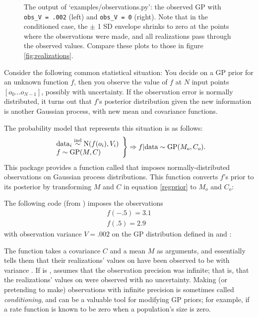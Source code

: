 \begin{figure}
    \centering
    \caption{The output of {\sffamily `examples/observations.py'}: the observed GP with \texttt{obs_V = .002} (left) and \texttt{obs_V = 0} (right). Note that in the conditioned case, the $\pm$ 1 SD envelope shrinks to zero at the points where the observations were made, and all realizations pass through the observed values. Compare these plots to those in figure \ref{fig:realizations}.}
    \label{fig:obs}
\end{figure}

Consider the following common statistical situation: You decide on a GP prior for an unknown function $f$, then you observe the value of $f$ at $N$ input points $[o_0\ldots o_{N-1}]$, possibly with uncertainty. If the observation error is normally distributed, it turns out that $f$'s posterior distribution given the new information is another Gaussian process, with new mean and covariance functions.

The probability model that represents this situation is as follows:
\begin{equation}
    \label{regprior}
    \left.\begin{array}{l}
        \textup{data}_i \stackrel{\tiny{\textup{ind}}}{\sim} \textup{N}(f(o_i), V_i)\\
        f \sim \textup{GP}(M,C)\\
    \end{array}\right\}\Rightarrow f|\textup{data} \sim \textup{GP}(M_o, C_o).
\end{equation}
This package provides a function called  that imposes normally-distributed observations on Gaussian process distributions. This function converts $f$'s prior to its posterior by transforming $M$ and $C$ in equation \ref{regprior} to $M_o$ and $C_o$:

The following code (from ) imposes the observations
\begin{eqnarray*}
    f(-.5) = 3.1\\
    f(.5) = 2.9
\end{eqnarray*}
with observation variance $V=.002$ on the GP distribution defined in  and :


The function  takes a covariance $C$ and a mean $M$ as arguments, and essentially tells them that their realizations' values on  have been observed to be  with variance . If  is ,  assumes that the observation precision was infinite; that is, that the realizations' values on  were observed with no uncertainty. Making (or pretending to make) observations with infinite precision is sometimes called \emph{conditioning}, and can be a valuable tool for modifying GP priors; for example, if a rate function is known to be zero when a population's size is zero.

